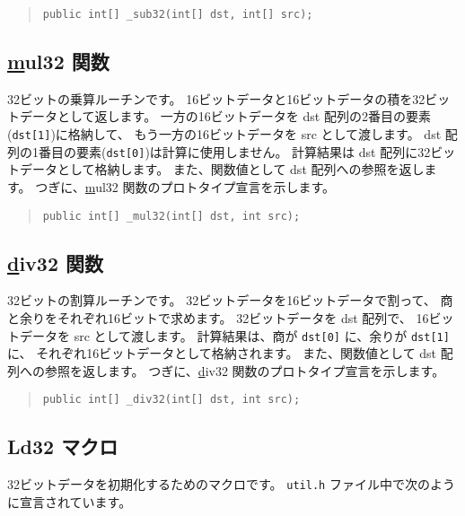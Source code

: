\begin{quote}
\begin{verbatim}
public int[] _sub32(int[] dst, int[] src);
\end{verbatim}
\end{quote}

\subsection{\ul mul32 関数}

32ビットの乗算ルーチンです。
16ビットデータと16ビットデータの積を32ビットデータとして返します。
一方の16ビットデータを dst 配列の2番目の要素(\verb/dst[1]/)に格納して、
もう一方の16ビットデータを src として渡します。
dst 配列の1番目の要素(\verb/dst[0]/)は計算に使用しません。
計算結果は dst 配列に32ビットデータとして格納します。
また、関数値として dst 配列への参照を返します。
つぎに、\ul mul32 関数のプロトタイプ宣言を示します。

\begin{quote}
\begin{verbatim}
public int[] _mul32(int[] dst, int src);
\end{verbatim}
\end{quote}

\subsection{\ul div32 関数}

32ビットの割算ルーチンです。
32ビットデータを16ビットデータで割って、
商と余りをそれぞれ16ビットで求めます。
32ビットデータを dst 配列で、
16ビットデータを src として渡します。
計算結果は、商が \verb/dst[0]/ に、余りが \verb/dst[1]/ に、
それぞれ16ビットデータとして格納されます。
また、関数値として dst 配列への参照を返します。
つぎに、\ul div32 関数のプロトタイプ宣言を示します。

\begin{quote}
\begin{verbatim}
public int[] _div32(int[] dst, int src);
\end{verbatim}
\end{quote}

\subsection{Ld32 マクロ}

32ビットデータを初期化するためのマクロです。
\verb/util.h/ ファイル中で次のように宣言されています。


